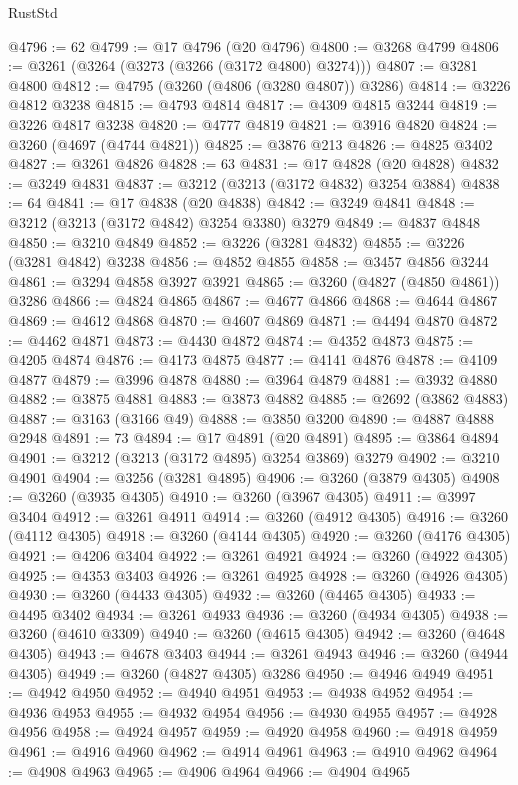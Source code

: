 \begin{lexlean}{RustStd}
\begin{coremodule}
@4796 := 62
@4799 := @17 @4796 (@20 @4796)
@4800 := @3268 @4799
@4806 := @3261 (@3264 (@3273 (@3266 (@3172 @4800) @3274)))
@4807 := @3281 @4800
@4812 := @4795 (@3260 (@4806 (@3280 @4807)) @3286)
@4814 := @3226 @4812 @3238
@4815 := @4793 @4814
@4817 := @4309 @4815 @3244
@4819 := @3226 @4817 @3238
@4820 := @4777 @4819
@4821 := @3916 @4820
@4824 := @3260 (@4697 (@4744 @4821))
@4825 := @3876 @213
@4826 := @4825 @3402
@4827 := @3261 @4826
@4828 := 63
@4831 := @17 @4828 (@20 @4828)
@4832 := @3249 @4831
@4837 := @3212 (@3213 (@3172 @4832) @3254 @3884)
@4838 := 64
@4841 := @17 @4838 (@20 @4838)
@4842 := @3249 @4841
@4848 := @3212 (@3213 (@3172 @4842) @3254 @3380) @3279
@4849 := @4837 @4848
@4850 := @3210 @4849
@4852 := @3226 (@3281 @4832)
@4855 := @3226 (@3281 @4842) @3238
@4856 := @4852 @4855
@4858 := @3457 @4856 @3244
@4861 := @3294 @4858 @3927 @3921
@4865 := @3260 (@4827 (@4850 @4861)) @3286
@4866 := @4824 @4865
@4867 := @4677 @4866
@4868 := @4644 @4867
@4869 := @4612 @4868
@4870 := @4607 @4869
@4871 := @4494 @4870
@4872 := @4462 @4871
@4873 := @4430 @4872
@4874 := @4352 @4873
@4875 := @4205 @4874
@4876 := @4173 @4875
@4877 := @4141 @4876
@4878 := @4109 @4877
@4879 := @3996 @4878
@4880 := @3964 @4879
@4881 := @3932 @4880
@4882 := @3875 @4881
@4883 := @3873 @4882
@4885 := @2692 (@3862 @4883)
@4887 := @3163 (@3166 @49)
@4888 := @3850 @3200
@4890 := @4887 @4888 @2948
@4891 := 73
@4894 := @17 @4891 (@20 @4891)
@4895 := @3864 @4894
@4901 := @3212 (@3213 (@3172 @4895) @3254 @3869) @3279
@4902 := @3210 @4901
@4904 := @3256 (@3281 @4895)
@4906 := @3260 (@3879 @4305)
@4908 := @3260 (@3935 @4305)
@4910 := @3260 (@3967 @4305)
@4911 := @3997 @3404
@4912 := @3261 @4911
@4914 := @3260 (@4912 @4305)
@4916 := @3260 (@4112 @4305)
@4918 := @3260 (@4144 @4305)
@4920 := @3260 (@4176 @4305)
@4921 := @4206 @3404
@4922 := @3261 @4921
@4924 := @3260 (@4922 @4305)
@4925 := @4353 @3403
@4926 := @3261 @4925
@4928 := @3260 (@4926 @4305)
@4930 := @3260 (@4433 @4305)
@4932 := @3260 (@4465 @4305)
@4933 := @4495 @3402
@4934 := @3261 @4933
@4936 := @3260 (@4934 @4305)
@4938 := @3260 (@4610 @3309)
@4940 := @3260 (@4615 @4305)
@4942 := @3260 (@4648 @4305)
@4943 := @4678 @3403
@4944 := @3261 @4943
@4946 := @3260 (@4944 @4305)
@4949 := @3260 (@4827 @4305) @3286
@4950 := @4946 @4949
@4951 := @4942 @4950
@4952 := @4940 @4951
@4953 := @4938 @4952
@4954 := @4936 @4953
@4955 := @4932 @4954
@4956 := @4930 @4955
@4957 := @4928 @4956
@4958 := @4924 @4957
@4959 := @4920 @4958
@4960 := @4918 @4959
@4961 := @4916 @4960
@4962 := @4914 @4961
@4963 := @4910 @4962
@4964 := @4908 @4963
@4965 := @4906 @4964
@4966 := @4904 @4965

\end{coremodule}
\end{lexlean}
